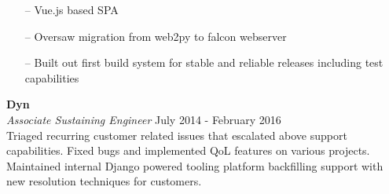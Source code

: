 \begin{minipage}[t]{\linewidth}
    \begin{itemize}
        \item[--] Vue.js based SPA
        \item[--] Oversaw migration from web2py to falcon webserver
        \item[--] Built out first build system for stable and reliable releases including test capabilities
    \end{itemize}
    \end{minipage}

\large{\textbf{Dyn}} \\
\textit{Associate Sustaining Engineer} \hfill July 2014 - February 2016 \\[3.75pt]
Triaged recurring customer related issues that escalated above support capabilities. Fixed bugs and implemented QoL features on various projects. Maintained internal Django powered tooling platform backfilling support with new resolution techniques for customers.
